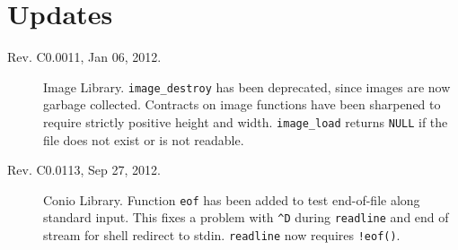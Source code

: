 \documentclass[11pt]{article}
\begin{document}
\section{Updates}
\label{sec:updates}
\hypertarget{sec:updates}{}

\begin{description}
\item[Rev. C0.0011, Jan 06, 2012.]  Image Library.
  \verb'image_destroy' has been deprecated, since images are now
  garbage collected.  Contracts on image functions have been sharpened
  to require strictly positive height and width.  \verb'image_load'
  returns \verb'NULL' if the file does not exist or is not readable.
\item[Rev. C0.0113, Sep 27, 2012.]  Conio Library.
  Function \verb'eof' has been added to test end-of-file along
  standard input.  This fixes a problem with \verb'^D' during
  \verb'readline' and end of stream for shell redirect to stdin.
  \verb'readline' now requires \verb'!eof()'.
\end{description}
\end{document}
